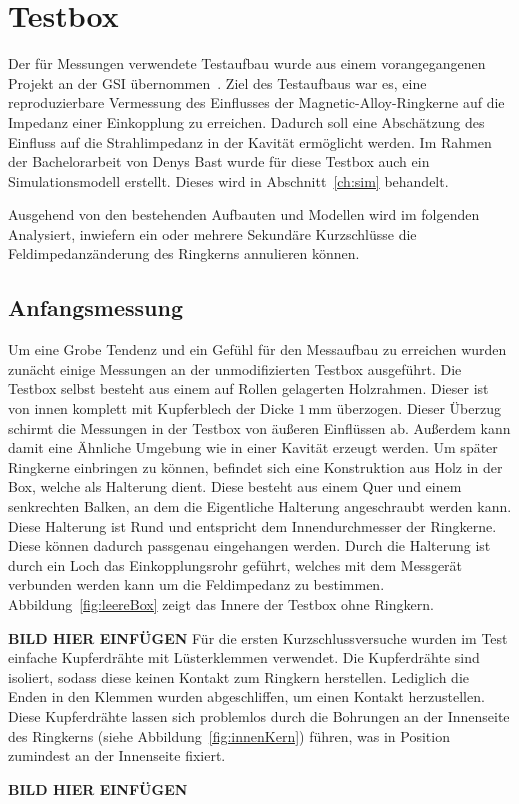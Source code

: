\section{Testbox}
Der f\"ur Messungen verwendete Testaufbau wurde aus einem vorangegangenen Projekt an der GSI \"ubernommen~\cite{harzheim2016modeling}. Ziel des Testaufbaus war es, eine reproduzierbare Vermessung des Einflusses der Magnetic-Alloy-Ringkerne auf die Impedanz einer Einkopplung zu erreichen. Dadurch soll eine Absch\"atzung des Einfluss auf die Strahlimpedanz in der Kavit\"at erm\"oglicht werden. Im Rahmen der Bachelorarbeit von Denys Bast wurde f\"ur diese Testbox auch ein Simulationsmodell erstellt. Dieses wird in Abschnitt~\ref{ch:sim} behandelt. 
\par
Ausgehend von den bestehenden Aufbauten und Modellen wird im folgenden Analysiert, inwiefern ein oder mehrere Sekund\"are Kurzschl\"usse die Feldimpedanz\"anderung des Ringkerns annulieren k\"onnen. 

\subsection{Anfangsmessung}
Um eine Grobe Tendenz und ein Gef\"uhl f\"ur den Messaufbau zu erreichen wurden zun\"acht einige Messungen an der unmodifizierten Testbox ausgef\"uhrt. Die Testbox selbst besteht aus einem auf Rollen gelagerten Holzrahmen. Dieser ist von innen komplett mit Kupferblech der Dicke $\SI{1}{\milli\meter}$ \"uberzogen. Dieser Überzug schirmt die Messungen in der Testbox von \"au\ss{}eren Einfl\"ussen ab. Au\ss{}erdem kann damit eine Ähnliche Umgebung wie in einer Kavit\"at erzeugt werden. Um sp\"ater Ringkerne einbringen zu k\"onnen, befindet sich eine Konstruktion aus Holz in der Box, welche als Halterung dient. Diese besteht aus einem Quer und einem senkrechten Balken, an dem die Eigentliche Halterung angeschraubt werden kann. Diese Halterung ist Rund und entspricht dem Innendurchmesser der Ringkerne. Diese k\"onnen dadurch passgenau eingehangen werden. Durch die Halterung ist durch ein Loch das Einkopplungsrohr gef\"uhrt, welches mit dem Messger\"at verbunden werden kann um die Feldimpedanz zu bestimmen. Abbildung~\ref{fig:leereBox} zeigt das Innere der Testbox ohne Ringkern.
\par
\textbf{BILD HIER EINFÜGEN}
F\"ur die ersten Kurzschlussversuche wurden im Test einfache Kupferdr\"ahte mit L\"usterklemmen verwendet. Die Kupferdr\"ahte sind isoliert, sodass diese keinen Kontakt zum Ringkern herstellen. Lediglich die Enden in den Klemmen wurden abgeschliffen, um einen Kontakt herzustellen. Diese Kupferdr\"ahte lassen sich problemlos durch die Bohrungen an der Innenseite des Ringkerns (siehe Abbildung~\ref{fig:innenKern}) f\"uhren, was in Position zumindest an der Innenseite fixiert.
\par
\textbf{BILD HIER EINFÜGEN}


